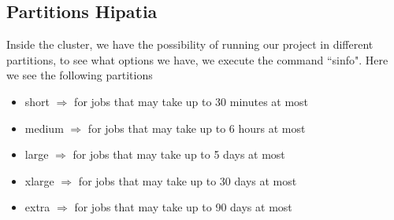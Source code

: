 \documentclass[a4paper]{article}
\begin{document}
		\subsection{Partitions Hipatia}
			Inside the cluster, we have the possibility of running our project in different partitions, to see what options we have, we execute the command ``sinfo". Here we see the following partitions\\ 
			\begin{itemize}
				\item short $\Rightarrow$ for jobs that may take up to 30 minutes at most
				\item medium $\Rightarrow$ for jobs that may take up to 6 hours at most
				\item large $\Rightarrow$ for jobs that may take up to 5 days at most
				\item xlarge $\Rightarrow$ for jobs that may take up to 30 days at most
				\item extra $\Rightarrow$ for jobs that may take up to 90 days at most
			\end{itemize} 
\end{document}
